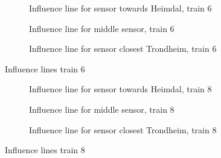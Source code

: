 \begin{figure}[htpb]
  \begin{subfigure}[t]{0.9\textwidth}
    \centering
    
    \caption{Influence line for sensor towards Heimdal, train 6}
    \label{infl_Heimdal_train6}
  \end{subfigure}
  \begin{subfigure}[t]{0.9\textwidth}
    \centering
    
    \caption{Influence line for middle sensor, train 6}
    \label{infl_middle_train6}
  \end{subfigure}
  \begin{subfigure}[t]{0.9\textwidth}
    \centering
    
    \caption{Influence line for sensor closest Trondheim, train 6}
    \label{infl_Trondheim_train6}
  \end{subfigure}
  \caption{Influence lines train 6}
  \label{influence_lines_train6}
\end{figure}

\begin{figure}[htpb]
  \begin{subfigure}[t]{0.9\textwidth}
    \centering
    
    \caption{Influence line for sensor towards Heimdal, train 8}
    \label{infl_Heimdal_train8}
  \end{subfigure}
  \begin{subfigure}[t]{0.9\textwidth}
    \centering
    
    \caption{Influence line for middle sensor, train 8}
    \label{infl_middle_train8}
  \end{subfigure}
  \begin{subfigure}[t]{0.9\textwidth}
    \centering
    
    \caption{Influence line for sensor closest Trondheim, train 8}
    \label{infl_Trondheim_train8}
  \end{subfigure}
  \caption{Influence lines train 8}
  \label{influence_lines_train8}
\end{figure}


